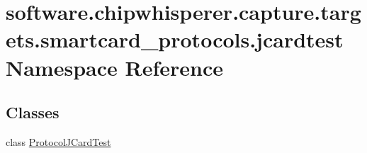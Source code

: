 \hypertarget{namespacesoftware_1_1chipwhisperer_1_1capture_1_1targets_1_1smartcard__protocols_1_1jcardtest}{}\section{software.\+chipwhisperer.\+capture.\+targets.\+smartcard\+\_\+protocols.\+jcardtest Namespace Reference}
\label{namespacesoftware_1_1chipwhisperer_1_1capture_1_1targets_1_1smartcard__protocols_1_1jcardtest}
\subsection*{Classes}
\begin{DoxyCompactItemize}
\item 
class \hyperlink{classsoftware_1_1chipwhisperer_1_1capture_1_1targets_1_1smartcard__protocols_1_1jcardtest_1_1ProtocolJCardTest}{Protocol\+J\+Card\+Test}
\end{DoxyCompactItemize}
